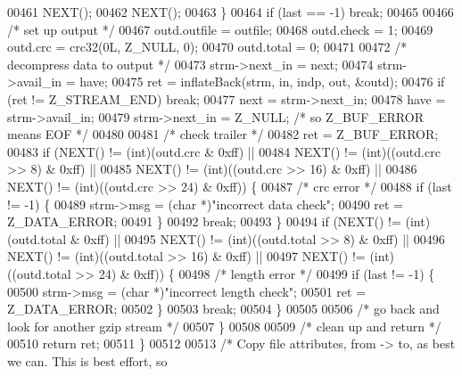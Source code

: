 \begin{DoxyCode}
00461             NEXT();
00462             NEXT();
00463         \}
00464         \textcolor{keywordflow}{if} (last == -1) \textcolor{keywordflow}{break};
00465 
00466         \textcolor{comment}{/* set up output */}
00467         outd.outfile = outfile;
00468         outd.check = 1;
00469         outd.crc = crc32(0L, Z\_NULL, 0);
00470         outd.total = 0;
00471 
00472         \textcolor{comment}{/* decompress data to output */}
00473         strm->next\_in = next;
00474         strm->avail\_in = have;
00475         ret = inflateBack(strm, in, indp, out, &outd);
00476         \textcolor{keywordflow}{if} (ret != Z\_STREAM\_END) \textcolor{keywordflow}{break};
00477         next = strm->next\_in;
00478         have = strm->avail\_in;
00479         strm->next\_in = Z\_NULL;             \textcolor{comment}{/* so Z\_BUF\_ERROR means EOF */}
00480 
00481         \textcolor{comment}{/* check trailer */}
00482         ret = Z\_BUF\_ERROR;
00483         \textcolor{keywordflow}{if} (NEXT() != (\textcolor{keywordtype}{int})(outd.crc & 0xff) ||
00484             NEXT() != (\textcolor{keywordtype}{int})((outd.crc >> 8) & 0xff) ||
00485             NEXT() != (\textcolor{keywordtype}{int})((outd.crc >> 16) & 0xff) ||
00486             NEXT() != (\textcolor{keywordtype}{int})((outd.crc >> 24) & 0xff)) \{
00487             \textcolor{comment}{/* crc error */}
00488             \textcolor{keywordflow}{if} (last != -1) \{
00489                 strm->msg = (\textcolor{keywordtype}{char} *)\textcolor{stringliteral}{"incorrect data check"};
00490                 ret = Z\_DATA\_ERROR;
00491             \}
00492             \textcolor{keywordflow}{break};
00493         \}
00494         \textcolor{keywordflow}{if} (NEXT() != (int)(outd.total & 0xff) ||
00495             NEXT() != (int)((outd.total >> 8) & 0xff) ||
00496             NEXT() != (int)((outd.total >> 16) & 0xff) ||
00497             NEXT() != (int)((outd.total >> 24) & 0xff)) \{
00498             \textcolor{comment}{/* length error */}
00499             \textcolor{keywordflow}{if} (last != -1) \{
00500                 strm->msg = (\textcolor{keywordtype}{char} *)\textcolor{stringliteral}{"incorrect length check"};
00501                 ret = Z\_DATA\_ERROR;
00502             \}
00503             \textcolor{keywordflow}{break};
00504         \}
00505 
00506         \textcolor{comment}{/* go back and look for another gzip stream */}
00507     \}
00508 
00509     \textcolor{comment}{/* clean up and return */}
00510     \textcolor{keywordflow}{return} ret;
00511 \}
00512 
00513 \textcolor{comment}{/* Copy file attributes, from -> to, as best we can.  This is best effort, so}

\end{DoxyCode}
